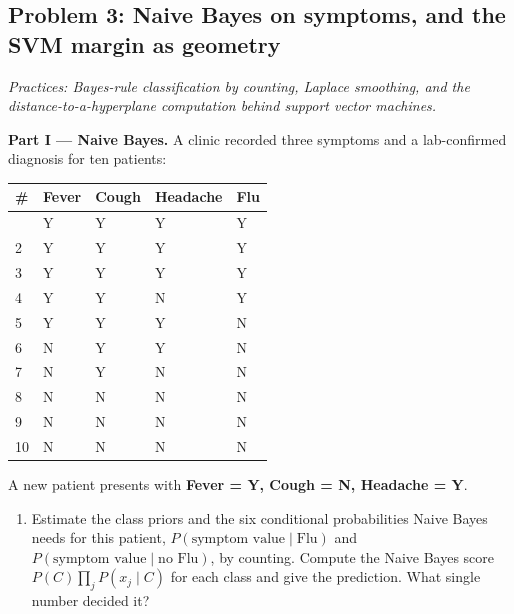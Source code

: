 \documentclass[
  11pt,
]{article}
\newcounter{none} %
\providecommand{\tightlist}{%
  \setlength{\itemsep}{0pt}\setlength{\parskip}{0pt}}
\newcommand{\answerpage}{\clearpage}
\begin{document}
\answerpage

\subsection{Problem 3: Naive Bayes on symptoms, and the SVM margin as
geometry}\label{problem-3-naive-bayes-on-symptoms-and-the-svm-margin-as-geometry}

\emph{Practices: Bayes-rule classification by counting, Laplace
smoothing, and the distance-to-a-hyperplane computation behind support
vector machines.}

\textbf{Part I --- Naive Bayes.} A clinic recorded three symptoms and a
lab-confirmed diagnosis for ten patients:

{\def\LTcaptype{none} %
\begin{longtable}[]{@{}lllll@{}}
\toprule\noalign{}
\# & Fever & Cough & Headache & Flu \\
\midrule\noalign{}
\endhead
\bottomrule\noalign{}
\endlastfoot
1 & Y & Y & Y & Y \\
2 & Y & Y & Y & Y \\
3 & Y & Y & Y & Y \\
4 & Y & Y & N & Y \\
5 & Y & Y & Y & N \\
6 & N & Y & Y & N \\
7 & N & Y & N & N \\
8 & N & N & N & N \\
9 & N & N & N & N \\
10 & N & N & N & N \\
\end{longtable}
}

A new patient presents with \textbf{Fever = Y, Cough = N, Headache = Y}.

\begin{enumerate}
\def\labelenumi{(\alph{enumi})}
\tightlist
\item
  Estimate the class priors and the six conditional probabilities Naive
  Bayes needs for this patient,
  \(P(\text{symptom value} \mid \text{Flu})\) and
  \(P(\text{symptom value} \mid \text{no Flu})\), by counting. Compute
  the Naive Bayes score \(P(C)\prod_j P(x_j \mid C)\) for each class and
  give the prediction. What single number decided it?
\end{enumerate}
\end{document}
